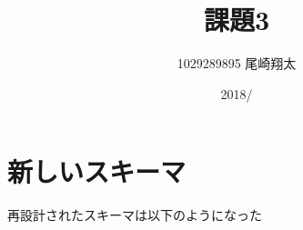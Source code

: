 \documentclass{jarticle}
\begin{document}
\title{課題3}
\author{1029289895 尾崎翔太}
\date{2018/}

\maketitle
\newpage


\section{新しいスキーマ}
再設計されたスキーマは以下のようになった
\begin{itemize}
\end{itemize}
\end{document}
